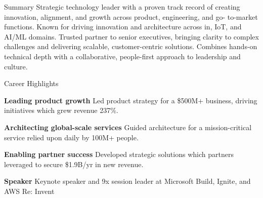 \documentclass{resume} %
\begin{document}
\vspace{-1em}
\begin{rSummary}{Summary}
  Strategic technology leader with a proven track record of creating innovation, alignment, and growth across product, engineering, and go- to-market functions. Known for driving innovation and architecture across in, IoT, and AI/ML domains.
  \newline \newline
  Trusted partner to senior executives, bringing clarity to complex challenges and delivering scalable, customer-centric solutions. Combines hands-on technical depth with a collaborative, people-first approach to leadership and culture.
\end{rSummary}
\begin{rAchievements}{Career Highlights}
  \item {\footnotesize\textbf{Leading product growth}} \newline Led product strategy for a \$500M+ business, driving initiatives which grew revenue 237\%.
  \item {\footnotesize\textbf{Architecting global-scale services}} \newline Guided architecture for a mission-critical service relied upon daily by 100M+ people.
  \item {\footnotesize\textbf{Enabling partner success}} \newline Developed strategic solutions which partners leveraged to secure \$1.9B/yr in new revenue.
  \item {\footnotesize\textbf{Speaker}} \newline Keynote speaker and 9x session leader at Microsoft Build, Ignite, and AWS Re: Invent
\end{rAchievements}
\end{document}
